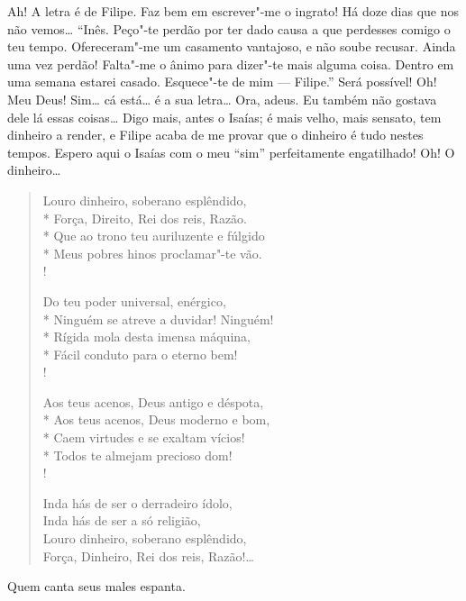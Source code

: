 \begin{linenumbers}
  Ah! A letra é de Filipe. Faz bem em escrever"-me o ingrato! Há doze
dias que nos não vemos\ldots{} 
“Inês.  Peço"-te perdão por ter dado causa a que perdesses comigo o teu tempo.
Ofereceram"-me um casamento vantajoso, e não soube recusar. Ainda uma vez perdão!
Falta"-me o ânimo para dizer"-te mais alguma coisa.
Dentro em uma semana estarei casado. Esquece"-te de mim --- Filipe.”
 Será possível! Oh! Meu Deus!  Sim\ldots{} cá
está\ldots{} é a sua letra\ldots{}  Ora, adeus. Eu também não gostava dele lá essas coisas\ldots{} Digo
mais, antes o
Isaías; é mais velho, mais sensato, tem dinheiro a render, e Filipe acaba de me
provar que o dinheiro é tudo nestes tempos. Espero aqui o Isaías com o meu “sim”
perfeitamente engatilhado! Oh! O dinheiro\ldots{}

\begin{verse} 
Louro dinheiro, soberano esplêndido,\\*
Força, Direito, Rei dos reis, Razão.\\*
Que ao trono teu auriluzente e fúlgido\\*
Meus pobres hinos proclamar"-te vão.\\! 

Do teu poder universal, enérgico,\\*
Ninguém se atreve a duvidar! Ninguém!\\*
Rígida mola desta imensa máquina,\\*
Fácil conduto para o eterno bem!\\!

Aos teus acenos, Deus antigo e déspota,\\*
Aos teus acenos, Deus moderno e bom,\\*
Caem virtudes e se exaltam vícios!\\*
Todos te almejam precioso dom!\\!

Inda hás de ser o derradeiro ídolo,\\
Inda hás de ser a só religião,\\
Louro dinheiro, soberano esplêndido,\\
Força, Dinheiro, Rei dos reis, Razão!\ldots{}
\end{verse}



   Quem canta seus males espanta.


\end{linenumbers}
